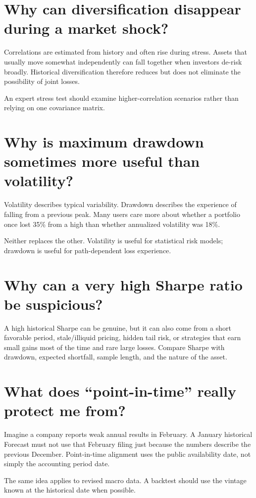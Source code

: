\documentclass[11pt]{article}
\begin{document}
\section{Why can diversification disappear during a market shock?}
Correlations are estimated from history and often rise during stress. Assets that usually move somewhat independently can fall together when investors de-risk broadly. Historical diversification therefore reduces but does not eliminate the possibility of joint losses.

An expert stress test should examine higher-correlation scenarios rather than relying on one covariance matrix.

\section{Why is maximum drawdown sometimes more useful than volatility?}
Volatility describes typical variability. Drawdown describes the experience of falling from a previous peak. Many users care more about whether a portfolio once lost 35\% from a high than whether annualized volatility was 18\%.

Neither replaces the other. Volatility is useful for statistical risk models; drawdown is useful for path-dependent loss experience.

\section{Why can a very high Sharpe ratio be suspicious?}
A high historical Sharpe can be genuine, but it can also come from a short favorable period, stale/illiquid pricing, hidden tail risk, or strategies that earn small gains most of the time and rare large losses. Compare Sharpe with drawdown, expected shortfall, sample length, and the nature of the asset.

\section{What does ``point-in-time'' really protect me from?}
Imagine a company reports weak annual results in February. A January historical Forecast must not use that February filing just because the numbers describe the previous December. Point-in-time alignment uses the public availability date, not simply the accounting period date.

The same idea applies to revised macro data. A backtest should use the vintage known at the historical date when possible.
\end{document}
